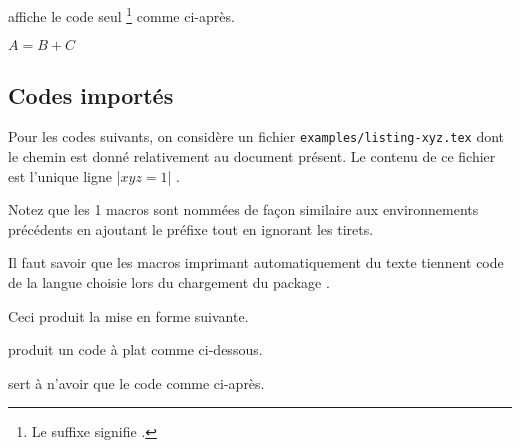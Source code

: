 \documentclass[12pt,a4paper]{article}
\begin{document}



 affiche le code seul
\footnote{
    Le suffixe  signifie .
}
comme ci-après.

\begin{doclatex-alone}
    $A = B + C$
\end{doclatex-alone}




\subsection{Codes importés}

Pour les codes suivants, on considère un fichier \verb+examples/listing-xyz.tex+ dont le chemin est donné relativement au document présent.
Le contenu de ce fichier est l'unique ligne \docilatex|$x y z = 1$| .

\medskip

Notez que les 1\ieres{} macros sont nommées de façon similaire aux environnements précédents en ajoutant le préfixe  tout en ignorant les tirets.


\begin{docrem}
	Il faut savoir que les macros imprimant automatiquement du texte tiennent code de la langue choisie lors du chargement du package .
\end{docrem}





\begin{doclatex-alone}
\end{doclatex-alone}

Ceci produit la mise en forme suivante.





\docexa[À la suite]

 produit un code à plat comme ci-dessous.







 sert à n'avoir que le code comme ci-après.
\end{document}

